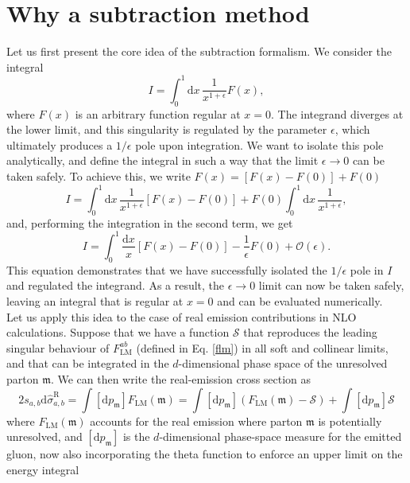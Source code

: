 \documentclass[a4paper, 12pt]{book}
\newcommand{\um}{\mathfrak{m}}
\begin{document}
\section{Why a subtraction method}
Let us first present the core idea of the subtraction formalism. We consider the integral
\begin{equation}
    I = \int_0^1 \mathrm{d}x \, \frac{1}{x^{1+\epsilon}} F(x),
\end{equation}
where $F(x)$ is an arbitrary function regular at $x=0$. The integrand diverges at the lower limit, and this singularity is regulated by the parameter $\epsilon$, which ultimately produces a $1/\epsilon$ pole upon integration. We want to isolate this pole analytically, and define the integral in such a way that the limit $\epsilon \to 0$ can be taken safely. To achieve this, we write $F(x)=[F(x)-F(0)]+F(0)$
\begin{equation}
    I = \int _0^1 \mathrm{d}x \, \frac{1}{x^{1+\epsilon}} [F(x)-F(0)]+F(0)\int_0^1 \mathrm{d}x \, \frac{1}{x^{1+\epsilon}},
\end{equation}
and, performing the integration in the second term, we get
\begin{equation}
    I = \int_0^1 \frac{\mathrm{d}x}{x}[F(x)-F(0)] - \frac{1}{\epsilon}F(0) + \mathcal{O}(\epsilon).
    \label{extraction-poles}
\end{equation}
This equation demonstrates that we have successfully isolated the $1/\epsilon$ pole in $I$ and regulated the integrand. As a result, the $\epsilon \to 0$ limit can now be taken safely, leaving an integral that is regular at $x=0$ and can be evaluated numerically.\\
Let us apply this idea to the case of real emission contributions in NLO calculations. Suppose that we have a function $\mathcal{S}$ that reproduces the leading singular behaviour of $F^{ab}_{\mathrm{LM}}$ (defined in Eq. \ref{flm}) in all soft and collinear limits, and that can be integrated in the $d$-dimensional phase space of the unresolved parton $\um$. We can then write the real-emission cross section as
\begin{equation}
    2s_{a,b} \mathrm{d} \hat{\sigma}_{a,b}^{\mathrm{R}} = \int [\mathrm{d}p_{\um}] F_{\mathrm{LM}}(\um) = \int [\mathrm{d}p_{\um}] (F_{\mathrm{LM}}(\um) - \mathcal{S}) + \int [\mathrm{d}p_{\um}] \mathcal{S}
    \label{subtraction-flm}
\end{equation}
where $F_{\mathrm{LM}}(\um)$ accounts for the real emission where parton $\um$ is potentially unresolved, and $[\mathrm{d}p_{\um}]$ is the $d$-dimensional phase-space measure for the emitted gluon, now also incorporating the theta function to enforce an upper limit on the energy integral
\end{document}
